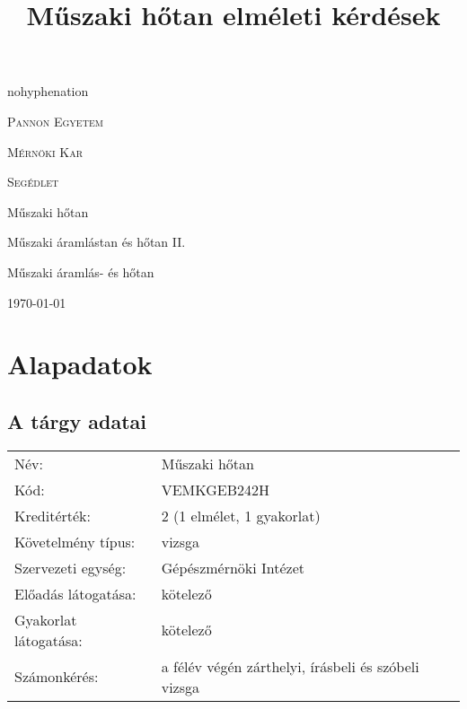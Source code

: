 \documentclass[11pt, a4paper]{report}
\author{}
\title{Műszaki hőtan elméleti kérdések}
\begin{document}
\begin{titlepage}
	\centering
	\begin{hyphenrules}{nohyphenation}
		{\scshape\LARGE Pannon Egyetem \par}
		{\scshape\LARGE Mérnöki Kar \par}
		\vspace{1cm}
		{\scshape\Large Segédlet\par}
		\vspace{1.5cm}
		\parbox{8cm}{{\centering\huge\bfseries{\JakiTitle} \par}}
		\vspace{2cm}
		{\Large\itshape\JakiAuthor\par}
		\vfill
		Műszaki hőtan \par
		Műszaki áramlástan és hőtan II.\par
		Műszaki áramlás- és hőtan

		\vfill

		{\large \today\par}
	\end{hyphenrules}
\end{titlepage}

\tableofcontents


\chapter*{Alapadatok}

\section*{A tárgy adatai}

\begin{tabular}{ l l }
Név: & Műszaki hőtan \\
Kód: & VEMKGEB242H \\
Kreditérték: & 2 (1 elmélet, 1 gyakorlat) \\
Követelmény típus: & vizsga \\
Szervezeti egység: & Gépészmérnöki Intézet \\
Előadás látogatása: & kötelező \\
Gyakorlat látogatása: & kötelező \\
Számonkérés: & a félév végén zárthelyi, írásbeli és szóbeli vizsga \\
\end{tabular}
\end{document}
